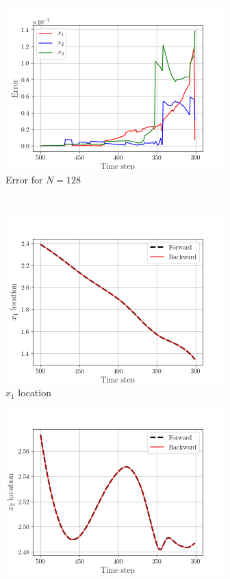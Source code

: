 \begin{figure}[H]
    \begin{subfigure}[H]{0.45\textwidth}
        \includegraphics[height=2.5in]{media/rk4/run-128/error-128-2.png}
        \caption{Error for $N=128$}
    \end{subfigure}
    ~
    \begin{subfigure}[H]{0.45\textwidth}
        \includegraphics[height=2.5in]{media/rk4/run-128/x1-128-tracking-2.png}
        \caption{$x_{1}$ location}
    \end{subfigure}
    \newline
    \begin{subfigure}[H]{0.45\textwidth}
        \includegraphics[height=2.5in]{media/rk4/run-128/x2-128-tracking-2.png}

\end{subfigure}
\end{figure}
